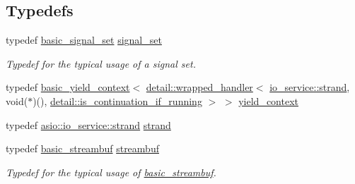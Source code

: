 \subsection*{Typedefs}
\begin{DoxyCompactItemize}
\item 
typedef \hyperlink{classasio_1_1basic__signal__set}{basic\+\_\+signal\+\_\+set} \hyperlink{namespaceasio_a4f135fc124cc60e4e00dc2dbb309f354}{signal\+\_\+set}
\begin{DoxyCompactList}\small\item\em Typedef for the typical usage of a signal set. \end{DoxyCompactList}\item 
typedef \hyperlink{classasio_1_1basic__yield__context}{basic\+\_\+yield\+\_\+context}$<$ \hyperlink{classasio_1_1detail_1_1wrapped__handler}{detail\+::wrapped\+\_\+handler}$<$ \hyperlink{classasio_1_1io__service_1_1strand}{io\+\_\+service\+::strand}, void($\ast$)(), \hyperlink{structasio_1_1detail_1_1is__continuation__if__running}{detail\+::is\+\_\+continuation\+\_\+if\+\_\+running} $>$ $>$ \hyperlink{namespaceasio_a41e285c1148c5ff12c443f3bfa9bdd9a}{yield\+\_\+context}
\item 
typedef \hyperlink{classasio_1_1io__service_1_1strand}{asio\+::io\+\_\+service\+::strand} \hyperlink{namespaceasio_a3be3fa00c86ab58ba41aabe8fcbf11be}{strand}
\item 
typedef \hyperlink{classasio_1_1basic__streambuf}{basic\+\_\+streambuf} \hyperlink{namespaceasio_a6a7ba348943527312eeace3492bf32ee}{streambuf}
\begin{DoxyCompactList}\small\item\em Typedef for the typical usage of \hyperlink{classasio_1_1basic__streambuf}{basic\+\_\+streambuf}. \end{DoxyCompactList}\end{DoxyCompactItemize}
